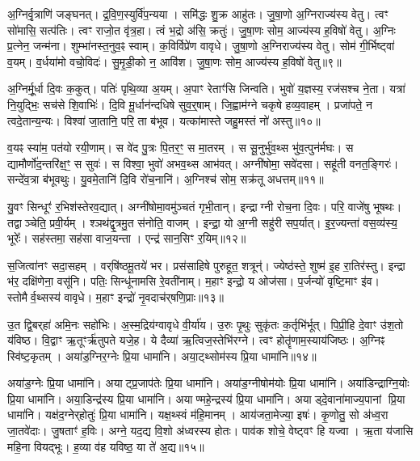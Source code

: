 अ॒ग्निर्वृ॒त्राणि॑ जङ्घनत्।
द्र॒वि॒ण॒स्युर्वि॑प॒न्यया।
समि॑द्धः शु॒क्र आहु॑तः।
जु॒षा॒णो अ॒ग्निराज्य॑स्य वेतु।
त्वꣳ सो॑मासि॒ सत्प॑तिः।
त्वꣳ राजो॒त वृ॑त्र॒हा।
त्वं भ॒द्रो अ॑सि॒ क्रतुः॑।
जु॒षा॒णः सोम॒ आज्य॑स्य ह॒विषो॑ वेतु।
अ॒ग्निः प्र॒त्नेन॒ जन्म॑ना।
शुम्भा॑नस्त॒नुव॒ꣴ स्वाम्।
क॒विर्विप्रे॑ण वावृधे।
जु॒षा॒णो अ॒ग्निराज्य॑स्य वेतु।
सोम॑ गी॒र्भिष्ट्वा॑ व॒यम्।
व॒र्धया॑मो वचो॒विदः॑।
सु॒मृ॒डी॒को न॒ आवि॑श।
जु॒षा॒णः सोम॒ आज्य॑स्य ह॒विषो॑ वेतु॥९॥\anuvakamend[स्वाꣳ षट् च॑]

अ॒ग्निर्मू॒र्धा दि॒वः क॒कुत्।
पतिः॑ पृथि॒व्या अ॒यम्।
अ॒पाꣳ रेताꣳ॑सि जिन्वति।
भुवो॑ य॒ज्ञस्य॒ रज॑सश्च ने॒ता।
यत्रा॑ नि॒युद्भिः॒ सच॑से शि॒वाभिः॑।
दि॒वि मू॒र्धान॑न्दधिषे सुव॒र्॒षाम्।
जि॒ह्वाम॑ग्ने चकृषे हव्य॒वाहम्।
प्रजा॑पते॒ न त्वदे॒तान्य॒न्यः।
विश्वा॑ जा॒तानि॒ परि॒ ता ब॑भूव।
यत्का॑मास्ते जहु॒मस्तं नो॑ अस्तु॥१०॥

व॒यꣴ स्या॑म॒ पत॑यो रयी॒णाम्।
स वे॑द पु॒त्रः पि॒तर॒ꣳ॒ स मा॒तरम्।
स सू॒नुर्भु॑व॒थ्स भु॑व॒त्पुन॑र्मघः।
स द्यामौर्णो॑द॒न्तरि॑क्ष॒ꣳ॒ स सुवः॑।
स विश्वा॒ भुवो॑ अभव॒थ्स आभ॑वत्।
अग्नी॑षोमा॒ सवे॑दसा।
सहू॑ती वनत॒ङ्गिरः॑।
सन्दे॑व॒त्रा ब॑भूवथुः।
यु॒वमे॒तानि॑ दि॒वि रो॑च॒नानि॑।
अ॒ग्निश्च॑ सोम॒ सक्र॑तू अधत्तम्॥११॥

यु॒वꣳ सिन्धूꣳ॑ र॒भिश॑स्तेरव॒द्यात्।
अग्नी॑षोमा॒वमु॑ञ्चतं गृभी॒तान्।
इन्द्राग्नी रोच॒ना दि॒वः।
परि॒ वाजे॑षु भूषथः।
तद्वाञ्चेति॒ प्रवी॒र्यम्।
श्ञथ॑द्वृ॒त्रमु॒त स॑नोति॒ वाजम्।
इन्द्रा॒ यो अ॒ग्नी सहु॑री सप॒र्यात्।
इ॒र॒ज्यन्ता॑ वस॒व्य॑स्य॒ भूरेः᳚।
सह॑स्तमा॒ सह॑सा वाज॒यन्ता।
एन्द्र॑ सान॒सिꣳ र॒यिम्॥१२॥

स॒जित्वा॑नꣳ सदा॒सहम्।
वर्‌\mbox{}षि॑ष्ठमू॒तये॑ भर।
प्रस॑साहिषे पुरुहूत॒ शत्रून्॑।
ज्येष्ठ॑स्ते॒ शुष्म॑ इ॒ह रा॒तिर॑स्तु।
इन्द्रा भ॑र॒ दक्षि॑णेना॒ वसू॑नि।
पतिः॒ सिन्धू॑नामसि रे॒वती॑नाम्।
म॒हाꣳ इन्द्रो॒ य ओज॑सा।
प॒र्जन्यो॑ वृष्टि॒माꣳ इ॑व।
स्तोमैर्व॒थ्सस्य॑ वावृधे।
म॒हाꣳ इन्द्रो॑ नृ॒वदाच॑र्‌\mbox{}षणि॒प्राः॥१३॥

उ॒त द्वि॒बर्‌\mbox{}हा॑ अमि॒नः सहो॑भिः।
अ॒स्म॒द्रिय॑ग्वावृधे वी॒र्या॑य।
उ॒रुः पृ॒थुः सुकृ॑तः क॒र्तृभि॑र्भूत्।
पि॒प्री॒हि दे॒वाꣳ उ॑श॒तो य॑विष्ठ।
वि॒द्वाꣳ ऋ॒तूꣳर्\mbox{}ऋ॑तुपते यजे॒ह।
ये दैव्या॑ ऋ॒त्विज॒स्तेभि॑रग्ने।
त्वꣳ होतॄ॑णाम॒स्याय॑जिष्ठः।
अ॒ग्निꣴ स्वि॑ष्ट॒कृतम्।
अया॑ड॒ग्निर॒ग्नेः प्रि॒या धामा॑नि।
अया॒ट्थ्सोम॑स्य प्रि॒या धामा॑नि॥१४॥

अया॑ड॒ग्नेः प्रि॒या धामा॑नि।
अयाट्प्र॒जाप॑तेः प्रि॒या धामा॑नि।
अया॑ड॒ग्नीषोम॑योः प्रि॒या धामा॑नि।
अया॑डिन्द्राग्नि॒योः प्रि॒या धामा॑नि।
अया॒डिन्द्र॑स्य प्रि॒या धामा॑नि।
अयाण्महे॒न्द्रस्य॑ प्रि॒या धामा॑नि।
अयाड्दे॒वाना॑माज्य॒पानां प्रि॒या धामा॑नि।
यक्ष॑द॒ग्नेर्‌\mbox{}होतुः॑ प्रि॒या धामा॑नि।
यक्ष॒थ्स्वं म॑हि॒मानम्।
आय॑जता॒मेज्या॒ इषः॑।
कृ॒णोतु॒ सो अ॑ध्व॒रा जा॒तवे॑दाः।
जु॒षताꣳ॑ ह॒विः।
अग्ने॒ यद॒द्य वि॒शो अ॑ध्वरस्य होतः।
पाव॑क शोचे॒ वेष्ट्वꣳ हि यज्वा।
ऋ॒ता य॑जासि महि॒ना वियद्भूः।
ह॒व्या व॑ह यविष्ठ॒ या ते॑ अ॒द्य॥१५॥\anuvakamend[अ॒स्त्व॒ध॒त्त॒ꣳ॒ र॒यिं च॑र्‌\mbox{}षणि॒प्राः सोम॑स्य प्रि॒या धामा॒नीषः॒ षट्च॑]

